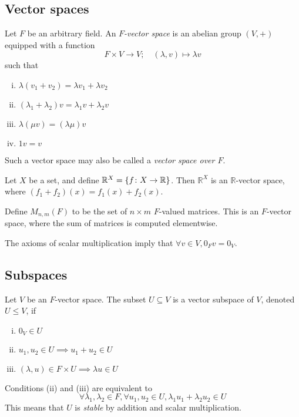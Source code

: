 \subsection{Vector spaces}
\begin{definition}
	Let \( F \) be an arbitrary field.
	An \textit{\( F \)-vector space} is an abelian group \( (V, +) \) equipped with a function
	\[
		F \times V \to V;\quad (\lambda, v) \mapsto \lambda v
	\]
	such that
	\begin{enumerate}[(i)]
		\item \( \lambda(v_1 + v_2) = \lambda v_1 + \lambda v_2 \)
		\item \( (\lambda_1 + \lambda_2) v = \lambda_1 v + \lambda_2 v \)
		\item \( \lambda ( \mu v ) = ( \lambda \mu ) v \)
		\item \( 1 v = v \)
	\end{enumerate}
	Such a vector space may also be called a \textit{vector space over \( F \)}.
\end{definition}

\begin{example}
	Let \( X \) be a set, and define \( \mathbb R^X = \qty{ f \colon X \to \mathbb R} \).
	Then \( \mathbb R^X \) is an \( \mathbb R \)-vector space, where \( (f_1 + f_2)(x) = f_1(x) + f_2(x) \).
\end{example}

\begin{example}
	Define \( M_{n,m}(F) \) to be the set of \( n \times m \) \( F \)-valued matrices.
	This is an \( F \)-vector space, where the sum of matrices is computed elementwise.
\end{example}

\begin{remark}
	The axioms of scalar multiplication imply that \( \forall v \in V, 0_F v = 0_V \).
\end{remark}

\subsection{Subspaces}
\begin{definition}
	Let \( V \) be an \( F \)-vector space.
	The subset \( U \subseteq V \) is a vector subspace of \( V \), denoted \( U \leq V \), if
	\begin{enumerate}[(i)]
		\item \( 0_V \in U \)
		\item \( u_1, u_2 \in U \implies u_1 + u_2 \in U \)
		\item \( (\lambda, u) \in F \times U \implies \lambda u \in U \)
	\end{enumerate}
	Conditions (ii) and (iii) are equivalent to
	\[
		\forall \lambda_1, \lambda_2 \in F, \forall u_1, u_2 \in U, \lambda_1 u_1 + \lambda_2 u_2 \in U
	\]
	This means that \( U \) is \textit{stable} by addition and scalar multiplication.
\end{definition}

